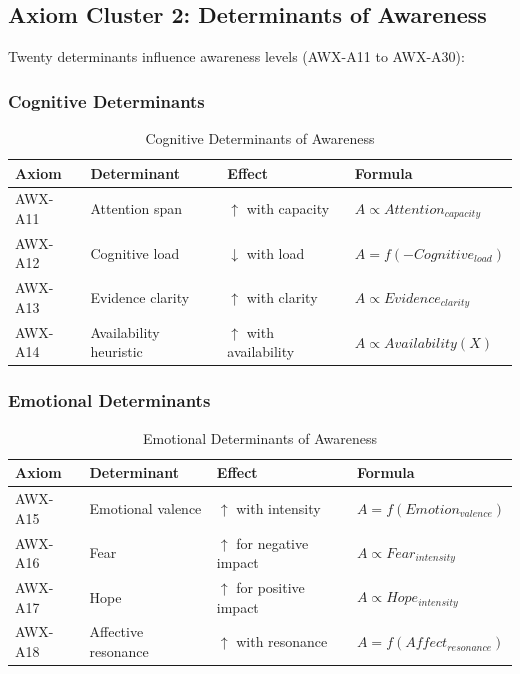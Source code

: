 \subsection{Axiom Cluster 2: Determinants of Awareness}
\label{subsec:axioms-determinants}

Twenty determinants influence awareness levels (AWX-A11 to AWX-A30):

\subsubsection{Cognitive Determinants}

\begin{table}[htbp]
\centering
\caption{Cognitive Determinants of Awareness}
\label{tab:cognitive-determinants}
\renewcommand{\arraystretch}{1.3}
\begin{tabular}{@{}llll@{}}
\toprule
\textbf{Axiom} & \textbf{Determinant} & \textbf{Effect} & \textbf{Formula} \\
\midrule
AWX-A11 & Attention span & $\uparrow$ with capacity & $A \propto Attention_{capacity}$ \\
AWX-A12 & Cognitive load & $\downarrow$ with load & $A = f(-Cognitive_{load})$ \\
AWX-A13 & Evidence clarity & $\uparrow$ with clarity & $A \propto Evidence_{clarity}$ \\
AWX-A14 & Availability heuristic & $\uparrow$ with availability & $A \propto Availability(X)$ \\
\bottomrule
\end{tabular}
\end{table}

\subsubsection{Emotional Determinants}

\begin{table}[htbp]
\centering
\caption{Emotional Determinants of Awareness}
\label{tab:emotional-determinants}
\renewcommand{\arraystretch}{1.3}
\begin{tabular}{@{}llll@{}}
\toprule
\textbf{Axiom} & \textbf{Determinant} & \textbf{Effect} & \textbf{Formula} \\
\midrule
AWX-A15 & Emotional valence & $\uparrow$ with intensity & $A = f(Emotion_{valence})$ \\
AWX-A16 & Fear & $\uparrow$ for negative impact & $A \propto Fear_{intensity}$ \\
AWX-A17 & Hope & $\uparrow$ for positive impact & $A \propto Hope_{intensity}$ \\
AWX-A18 & Affective resonance & $\uparrow$ with resonance & $A = f(Affect_{resonance})$ \\
\bottomrule
\end{tabular}
\end{table}

